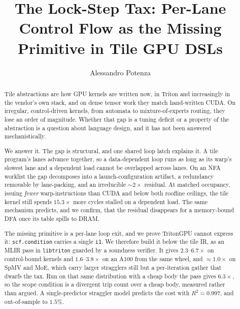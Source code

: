 \documentclass[sigplan,screen,review]{acmart}
\begin{document}
\title{The Lock-Step Tax: Per-Lane Control Flow as the Missing Primitive in Tile GPU DSLs}
\author{Alessandro Potenza}
\renewcommand{\shortauthors}{Potenza}

\begin{abstract}
Tile abstractions are how GPU kernels are written now, in Triton and increasingly in the
vendor's own stack, and on dense tensor work they match hand-written CUDA. On irregular,
control-driven kernels, from automata to mixture-of-experts routing, they lose an order of
magnitude. Whether that gap is a tuning
deficit or a property of the abstraction is a question about language design, and it has
not been answered mechanistically.

We answer it. The gap is structural, and one shared loop latch explains it. A tile
program's lanes advance together, so a data-dependent loop runs as long as its warp's
slowest lane and a dependent load cannot be overlapped across lanes. On an NFA worklist
the gap decomposes into a launch-configuration artifact, a redundancy removable by
lane-packing, and an irreducible ${\sim}2\times$ residual. At matched occupancy, issuing
\emph{fewer} warp-instructions than CUDA and below both roofline ceilings, the tile kernel
still spends $15.3\times$ more cycles stalled on a dependent load. The same mechanism
predicts, and we confirm, that the residual disappears for a memory-bound DFA once its
table spills to DRAM.

The missing primitive is a per-lane loop exit, and we prove TritonGPU cannot express it:
\texttt{scf.condition} carries a single \texttt{i1}. We therefore build it below the tile
IR, as an MLIR pass in \texttt{libtriton} guarded by a soundness verifier. It gives
$2.3$--$6.7\times$ on control-bound kernels and $1.6$--$3.8\times$ on an A100 from the same
wheel, and ${\approx}1.0\times$ on SpMV and MoE, which carry larger stragglers still but a
per-iteration gather that dwarfs the tax. Run on that same distribution with a cheap body
the pass gives $6.3\times$, so the scope condition is a divergent trip count over a cheap
body, measured rather than argued. A single-predictor straggler model predicts the cost with $R^2=0.997$, and
out-of-sample to $1.5\%$.
\end{abstract}
\end{document}
